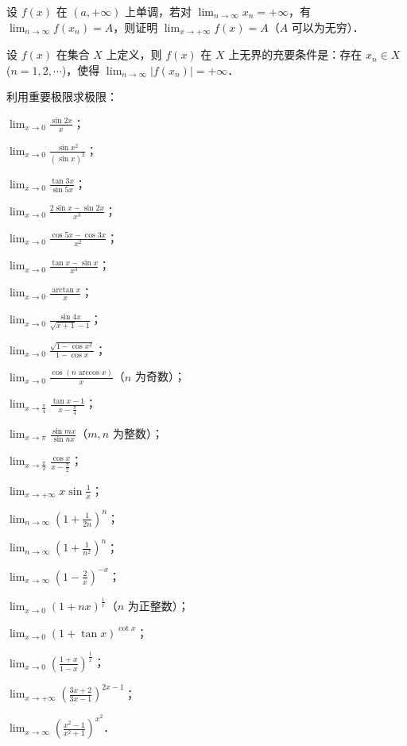 \begin{xiti}
\item 设 $f(x)$ 在 $(a, +\infty)$ 上单调，若对 $\lim_{n \to \infty} x_n = +\infty$，有 $\lim_{n \to \infty} f(x_n) = A$，则证明 $\lim_{x \to +\infty} f(x) = A$（$A$ 可以为无穷）．

\item 设 $f(x)$ 在集合 $X$ 上定义，则 $f(x)$ 在 $X$ 上无界的充要条件是：存在 $x_n \in X$ ($n = 1, 2, \cdots$)，使得 $\lim_{n \to \infty} |f(x_n)| = +\infty$．

\item 利用重要极限求极限：
\begin{ziti}
\item $\lim_{x \to 0} \frac{\sin 2x}{x}$；
\item $\lim_{x \to 0} \frac{\sin x^2}{(\sin x)^2}$；
\item $\lim_{x \to 0} \frac{\tan 3x}{\sin 5x}$；
\item $\lim_{x \to 0} \frac{2\sin x - \sin 2x}{x^3}$；
\item $\lim_{x \to 0} \frac{\cos 5x - \cos 3x}{x^2}$；
\item $\lim_{x \to 0} \frac{\tan x - \sin x}{x^3}$；
\item $\lim_{x \to 0} \frac{\arctan x}{x}$；
\item $\lim_{x \to 0} \frac{\sin 4x}{\sqrt{x+1} - 1}$；
\item $\lim_{x \to 0} \frac{\sqrt{1 - \cos x^2}}{1 - \cos x}$；
\item $\lim_{x \to 0} \frac{\cos(n\arccos x)}{x}$（$n$ 为奇数）；
\item $\lim_{x \to \frac{\pi}{4}} \frac{\tan x - 1}{x - \frac{\pi}{4}}$；
\item $\lim_{x \to \pi} \frac{\sin mx}{\sin nx}$（$m, n$ 为整数）；
\item $\lim_{x \to \frac{\pi}{2}} \frac{\cos x}{x - \frac{\pi}{2}}$；
\item $\lim_{x \to +\infty} x\sin\frac{1}{x}$；
\item $\lim_{n \to \infty} \left(1 + \frac{1}{2n}\right)^n$；
\item $\lim_{n \to \infty} \left(1 + \frac{1}{n^2}\right)^n$；
\item $\lim_{x \to \infty} \left(1 - \frac{2}{x}\right)^{-x}$；
\item $\lim_{x \to 0} (1 + nx)^{\frac{1}{x}}$（$n$ 为正整数）；
\item $\lim_{x \to 0} (1 + \tan x)^{\cot x}$；
\item $\lim_{x \to 0} \left(\frac{1+x}{1-x}\right)^{\frac{1}{x}}$；
\item $\lim_{x \to +\infty} \left(\frac{3x+2}{3x-1}\right)^{2x-1}$；
\item $\lim_{x \to \infty} \left(\frac{x^2-1}{x^2+1}\right)^{x^2}$．
\end{ziti}


\end{xiti}
